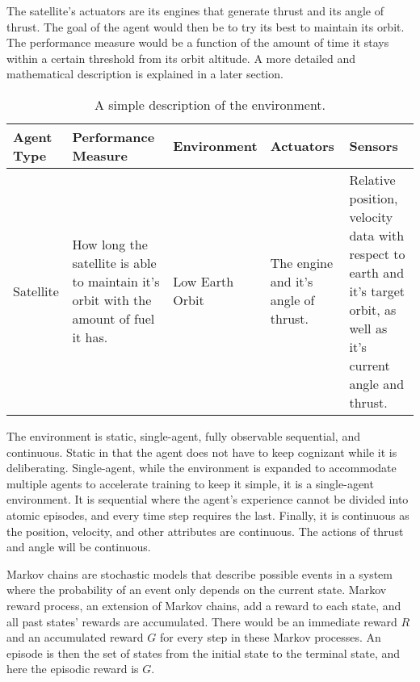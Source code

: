 \documentclass{article}
\begin{document}
The satellite's actuators are its engines that generate thrust and its angle of thrust. The goal of the agent would then be to try its best to maintain its orbit. The performance measure would be a function of the amount of time it stays within a certain threshold from its orbit altitude. A more detailed and mathematical description is explained in a later section.

\begin{table}
\caption{A simple description of the environment.}
\begin{tabularx}{\columnwidth}{|X||X|X|X|X|} \hline
Agent Type & Performance Measure & Environment & Actuators & Sensors \\ \hline
Satellite  & How long the satellite is able to maintain it's orbit with the amount of fuel it has. & 
Low Earth Orbit & The engine and it's angle of thrust. & Relative position, velocity data with respect to earth and it's target orbit, as well as it's current angle and thrust. \\ \hline
\end{tabularx}
\end{table}

The environment is static, single-agent, fully observable sequential, and continuous. Static in that the agent does not have to keep cognizant while it is deliberating. Single-agent, while the environment is expanded to accommodate multiple agents to accelerate training to keep it simple, it is a single-agent environment. It is sequential where the agent's experience cannot be divided into atomic episodes, and every time step requires the last. Finally, it is continuous as the position, velocity, and other attributes are continuous. The actions of thrust and angle will be continuous. 

Markov chains are stochastic models that describe possible events in a system where the probability of an event only depends on the current state. Markov reward process, an extension of Markov chains, add a reward to each state, and all past states' rewards are accumulated. There would be an immediate reward $R$ and an accumulated reward $G$ for every step in these Markov processes. An episode is then the set of states from the initial state to the terminal state, and here the episodic reward is $G$.
\end{document}
